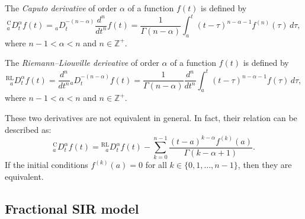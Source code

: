 \documentclass[00-main.tex]{subfiles}
\begin{document}
\begin{definition}
	The \textit{Caputo derivative} of order $\alpha$ of a function $f(t)$ is defined by
	\[ {}_{a}^{\mathrm{C}}\!D_t^\alpha f(t)
	= {}_{a}\!D_t^{-(n-\alpha)} \frac{d^n}{dt^n} f(t)
	= \frac{1}{\Gamma(n-\alpha)} \int_a^t (t-\tau)^{n-\alpha-1} f^{(n)}(\tau)\,d\tau,
	\]
	where $n-1 < \alpha < n$ and $n\in\mathbb{Z}^+$.
\end{definition}

\begin{definition}
	The \textit{Riemann--Liouville derivative} of order $\alpha$ of a function $f(t)$ is defined by
	\[ {}_{\phantom{R}a}^{\mathrm{RL}}\!D_t^\alpha f(t)
	= \frac{d^n}{dt^n} {}_{a}\!D_t^{-(n-\alpha)} f(t)
	= \frac{1}{\Gamma(n-\alpha)} \frac{d^n}{dt^n} \int_a^t (t-\tau)^{n-\alpha-1} f(\tau)\,d\tau,
	\]
	where $n-1 < \alpha < n$ and $n\in\mathbb{Z}^+$.
\end{definition}

These two derivatives are not equivalent in general.
In fact, their relation can be described as:
\[ {}_a^\mathrm{C}\!D_t^\alpha f(t) = {}_{\phantom{R}a}^\mathrm{RL}\!D_t^\alpha f(t) - \sum\limits_{k=0}^{n-1} \frac{(t-a)^{k-\alpha} f^{(k)}(a)}{\Gamma(k-\alpha+1)}. \]
If the initial conditions $f^{(k)}(a) = 0$ for all $k\in\{0,1,\ldots,n-1\}$, then they are equivalent.


\subsection{Fractional SIR model}
\end{document}

